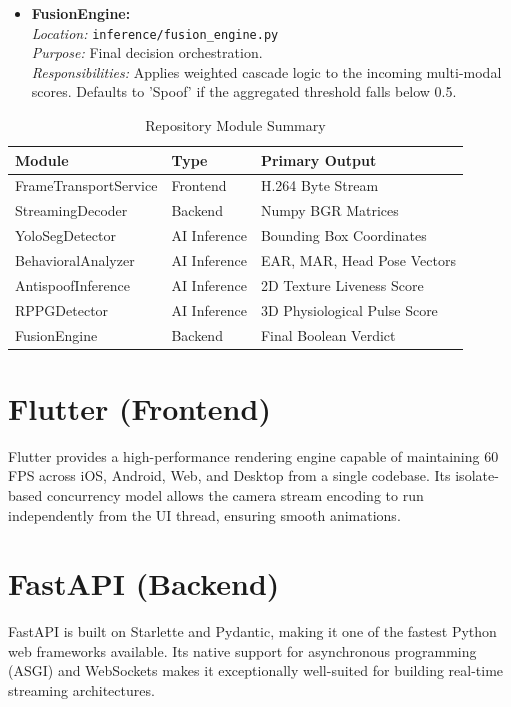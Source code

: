 \documentclass[12pt, a4paper]{report}
\begin{document}
\begin{itemize}
    \item \textbf{FusionEngine:} \\
    \textit{Location:} \texttt{inference/fusion\_engine.py} \\
    \textit{Purpose:} Final decision orchestration. \\
    \textit{Responsibilities:} Applies weighted cascade logic to the incoming multi-modal scores. Defaults to 'Spoof' if the aggregated threshold falls below 0.5.
\end{itemize}

\begin{table}[H]
\centering
\caption{Repository Module Summary}
\begin{tabularx}{\textwidth}{|l|l|X|}
\hline
\textbf{Module} & \textbf{Type} & \textbf{Primary Output} \\
\hline
FrameTransportService & Frontend & H.264 Byte Stream \\
StreamingDecoder & Backend & Numpy BGR Matrices \\
YoloSegDetector & AI Inference & Bounding Box Coordinates \\
BehavioralAnalyzer & AI Inference & EAR, MAR, Head Pose Vectors \\
AntispoofInference & AI Inference & 2D Texture Liveness Score \\
RPPGDetector & AI Inference & 3D Physiological Pulse Score \\
FusionEngine & Backend & Final Boolean Verdict \\
\hline
\end{tabularx}
\end{table}
\iffalse

\section{Flutter (Frontend)}
Flutter provides a high-performance rendering engine capable of maintaining 60 FPS across iOS, Android, Web, and Desktop from a single codebase. Its isolate-based concurrency model allows the camera stream encoding to run independently from the UI thread, ensuring smooth animations.

\section{FastAPI (Backend)}
FastAPI is built on Starlette and Pydantic, making it one of the fastest Python web frameworks available. Its native support for asynchronous programming (ASGI) and WebSockets makes it exceptionally well-suited for building real-time streaming architectures.
\end{document}
